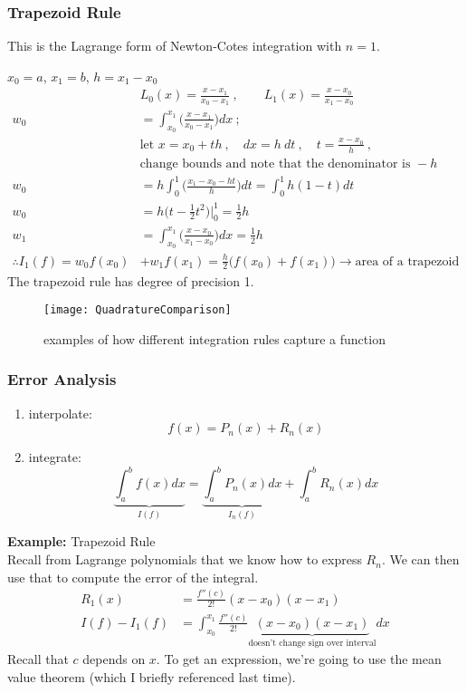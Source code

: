 \documentclass[12pt]{article}
\begin{document}
\subsubsection*{Trapezoid Rule}
This is the Lagrange form of Newton-Cotes integration with $n=1$.

$x_0 = a$, $x_1 = b$, $h = x_1 - x_0$
%
\begin{align*}
&L_0(x) = \frac{x-x_1}{x_0-x_1}\:, \qquad L_1(x) = \frac{x-x_0}{x_1-x_0} \\
%
w_0 &= \int_{x_0}^{x_1} \bigl(\frac{x-x_1}{x_0-x_1}\bigr) dx\:; 
\\ &\text{let } x = x_0 + th  \:, \quad dx = h\:dt\:, \quad t = \frac{x-x_0}{h}\:,\\
&\text{change bounds and note that the denominator is }-h \\
%
w_0 &= h \int_0^1 \bigl(\frac{x_1 - x_0 - ht}{h}\bigr)dt = \int_0^1 h(1-t)dt \\
%
w_0 &= h\bigl(t - \frac{1}{2}t^2 \bigr) |_0^1 = \frac{1}{2}h\\
%
w_1 &= \int_{x_0}^{x_1} \bigl(\frac{x-x_0}{x_1-x_0}\bigr) dx = \frac{1}{2}h\\
%
\therefore I_1(f) = w_0f(x_0) &+ w_1f(x_1)  = \boxed{\frac{h}{2}\bigl(f(x_0) + f(x_1)\bigr)} \rightarrow \text{area of a trapezoid}
\end{align*}
%
The trapezoid rule has degree of precision 1.

\begin{figure}
\begin{center}
  \texttt{[image: QuadratureComparison]}
\end{center}
\caption{examples of how different integration rules capture a function}
\end{figure}

\subsubsection*{Error Analysis}
\begin{enumerate}
\item interpolate:
\[f(x) = P_n(x) + R_n(x)\]
\item integrate:
\[\underbrace{\int_a^b f(x) dx}_{I(f)} = \underbrace{\int_a^b P_n(x)dx}_{I_n(f)} + \int_a^b R_n(x) dx\]
\end{enumerate}

\textbf{Example:} Trapezoid Rule\\
Recall from Lagrange polynomials that we know how to express $R_n$. We can then use that to compute the error of the integral.
\begin{align*}
R_1(x) &= \frac{f''(c)}{2!}(x-x_0)(x-x_1) \\
I(f) - I_1(f) &= \int_{x_0}^{x_1} \frac{f''(c)}{2!}\underbrace{(x-x_0)(x-x_1)}_{\text{doesn't change sign over interval}} dx
\end{align*}
%
Recall that $c$ depends on $x$. To get an expression, we're going to use the mean value theorem (which I briefly referenced last time).
\end{document}
